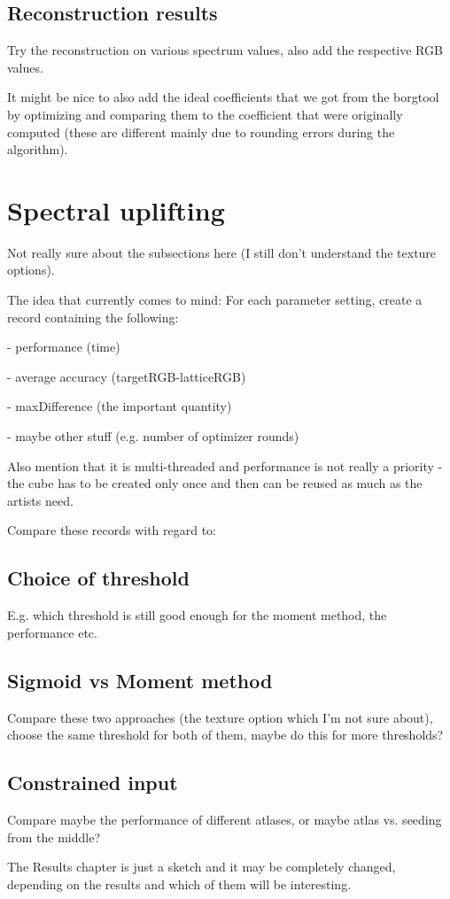 \subsection{Reconstruction results}
Try the reconstruction on various spectrum values, also add the respective RGB values.

It might be nice to also add the ideal coefficients that we got from the borgtool by optimizing and comparing them to the coefficient that were originally computed (these are different mainly due to rounding errors during the algorithm). 

\section{Spectral uplifting}

Not really sure about the subsections here (I still don't understand the texture options).

The idea that currently comes to mind: For each parameter setting, create a record containing the following: 

- performance (time)

- average accuracy (targetRGB-latticeRGB)

- maxDifference (the important quantity)

- maybe other stuff (e.g. number of optimizer rounds)

Also mention that it is multi-threaded and performance is not really a priority - the cube has to be created only once and then can be reused as much as the artists need.

Compare these records with regard to:

\subsection{Choice of threshold}

E.g. which threshold is still good enough for the moment method, the performance etc.

\subsection{Sigmoid vs Moment method}

Compare these two approaches (the texture option which I'm not sure about), choose the same threshold for both of them, maybe do this for more thresholds?

\subsection{Constrained input}

Compare maybe the performance of different atlases, or maybe atlas vs. seeding from the middle?

The Results chapter is just a sketch and it may be completely changed, depending on the results and which of them will be interesting.

